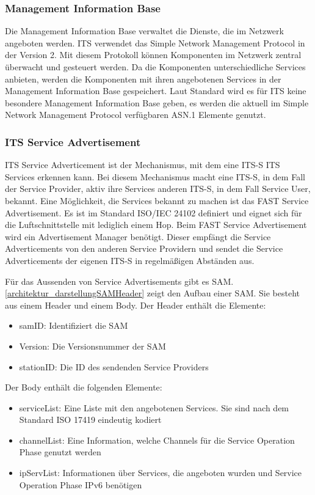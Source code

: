 \subsubsection{Management Information Base}
Die Management Information Base verwaltet die Dienste, die im Netzwerk angeboten werden. \ac{ITS} verwendet das Simple Network Management Protocol in der Version 2. Mit diesem Protokoll können Komponenten im Netzwerk zentral überwacht und gesteuert werden. Da die Komponenten unterschiedliche Services anbieten, werden die Komponenten mit ihren angebotenen Services in der Management Information Base gespeichert.
Laut Standard \cite{ts102723-2} wird es für \ac{ITS} keine besondere Management Information Base geben, es werden die aktuell im Simple Network Management Protocol ver\-füg\-baren \ac{ASN.1} Elemente genutzt. 


\subsubsection{ITS Service Advertisement}
\ac{ITS} Service Adverticement ist der Mechanismus, mit dem eine \ac{ITS-S} \ac{ITS} Services erkennen kann. Bei diesem Mechanismus macht eine \ac{ITS-S}, in dem Fall der Service Provider, aktiv ihre Services anderen \ac{ITS-S}, in dem Fall Service User, bekannt. Eine Möglichkeit, die Services bekannt zu machen ist das FAST Service Advertisement. Es ist im Standard ISO/IEC 24102 definiert und eignet sich für die Luftschnittstelle mit lediglich einem Hop. Beim FAST Service Advertisement wird ein Advertisement Manager benötigt. Dieser empfängt die Service Adverticements von den anderen Service Providern und sendet die Service Adverticements der eigenen \ac{ITS-S} in regelmäßigen Abständen aus.

Für das Aussenden von Service Advertisements gibt es \ac{SAM}. \autoref{architektur_darstellungSAMHeader} zeigt den Aufbau einer \ac{SAM}. Sie besteht aus einem Header und einem Body. Der Header enthält die Elemente:

\begin{itemize}
	\item samID: Identifiziert die \ac{SAM}
	\item Version: Die Versionsnummer der \ac{SAM}
	\item stationID: Die ID des sendenden Service Providers
\end{itemize}

Der Body enthält die folgenden Elemente:
\begin{itemize}
	\item serviceList: Eine Liste mit den angebotenen Services. Sie sind nach dem Standard ISO 17419 eindeutig kodiert
	\item channelList:  Eine Information, welche Channels für die Service Operation Phase genutzt werden
	\item ipServList: Informationen über Services, die angeboten wurden und Service Operation Phase IPv6 benötigen
\end{itemize} 



